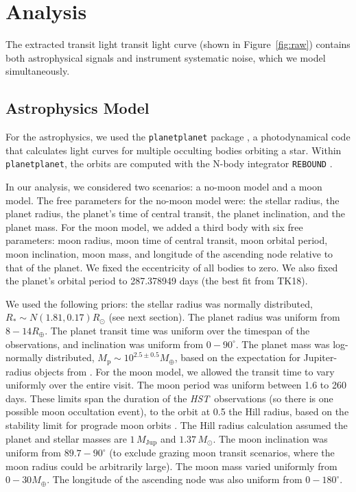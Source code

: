 \documentclass[twocolumn]{aastex62}
\newcommand{\project}[1]{\textsl{#1}}
\newcommand{\HST}{\project{HST}}
\begin{document}
\section{Analysis}
The extracted transit light transit light curve (shown in Figure~\ref{fig:raw}) contains both astrophysical signals and instrument systematic noise, which we model simultaneously. 

\subsection{Astrophysics Model}
For the astrophysics, we used the \texttt{planetplanet} package \citep{luger17}, a photodynamical code that calculates light curves for multiple occulting bodies orbiting a star. Within \texttt{planetplanet}, the orbits are computed with the N-body integrator \texttt{REBOUND} \citep{rein12}. %

In our analysis, we considered two scenarios: a no-moon model and a moon model. The free parameters for the no-moon model were: the stellar radius, the planet radius, the planet's time of central transit, the planet inclination, and the planet mass. For the moon model, we added a third body with six free parameters: moon radius, moon time of central transit, moon orbital period, moon inclination, moon mass, and longitude of the ascending node relative to that of the planet.  We fixed the eccentricity of all bodies to zero. We also fixed the planet's orbital period to 287.378949 days (the best fit from TK18). 

We used the following priors: the stellar radius was normally distributed, $R_* \sim N(1.81, 0.17) R_\odot$ (see next section). The planet radius was uniform from $8 - 14R_\oplus$. The planet transit time was uniform over the timespan of the observations, and inclination was uniform from $0 - 90^\circ$.  The planet mass was log-normally distributed, $M_\mathrm{p} \sim 10^{2.5 \pm 0.5} M_\oplus$, based on the expectation for Jupiter-radius objects from \cite{ning18}.  For the moon model, we allowed the transit time to vary uniformly over the entire visit. The moon period was uniform between 1.6 to 260 days. These limits span the duration of the \HST\ observations (so there is one possible moon occultation event), to the orbit at 0.5 the Hill radius, based on the stability limit for prograde moon orbits \citep{domingos06}. The Hill radius calculation assumed the planet and stellar masses are $1\,M_\mathrm{Jup}$ and $1.37\,M_\odot$. The moon inclination was uniform from $89.7 - 90^\circ$ (to exclude grazing moon transit scenarios, where the moon radius could be arbitrarily large). The moon mass varied uniformly from $0 - 30 M_\oplus$. The longitude of the ascending node was also uniform from $0 - 180^\circ$.
\end{document}
